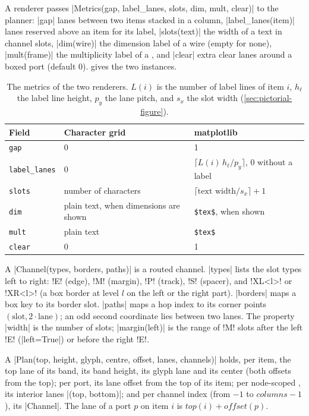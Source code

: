 \begin{definition}[Metrics]\label{def:pictorial-metrics}
A renderer passes \py|Metrics(gap, label_lanes, slots, dim, mult, clear)| to the planner:
\py|gap| lanes between two items stacked in a column, \py|label_lanes(item)| lanes reserved above
an item for its label, \py|slots(text)| the width of a text in channel slots,
\py|dim(wire)| the dimension label of a wire (empty for none), \py|mult(frame)| the
multiplicity label of a \bbox, and \py|clear| extra clear lanes around a boxed port (default 0).
 gives the two instances.
\end{definition}

\begin{table}[ht]
\centering
\caption{The metrics of the two renderers. $L(i)$ is the number of label lines of item $i$,
$h_\ell$ the label line height, $p_y$ the lane pitch, and $s_x$ the slot width
(\cref{sec:pictorial-figure}).}\label{tab:pictorial-metrics}
\begin{tabular}{@{}lll@{}}
\toprule
Field & Character grid & matplotlib \\
\midrule
\texttt{gap} & 0 & 1 \\
\texttt{label\_lanes} & 0 & $\lceil L(i)\,h_\ell / p_y\rceil$, 0 without a label \\
\texttt{slots} & number of characters & $\lceil \text{text width}/s_x\rceil + 1$ \\
\texttt{dim} & plain text, when dimensions are shown & \texttt{\$tex\$}, when shown \\
\texttt{mult} & plain text & \texttt{\$tex\$} \\
\texttt{clear} & 0 & 1 \\
\bottomrule
\end{tabular}
\end{table}

\begin{definition}\label{def:pictorial-plan}
A \py|Channel(types, borders, paths)| is a routed channel. \py|types| lists the slot types
left to right: \code!E! (edge), \code!M! (margin), \code!P! (track), \code!S! (spacer), and
\code!XL<l>! or \code!XR<l>! (a box border at level $l$ on the left or the right part).
\py|borders| maps a box key to its border slot. \py|paths| maps a hop index to its corner points
$(\text{slot}, 2\cdot\text{lane})$; an odd second coordinate lies between two lanes. The property
\py|width| is the number of slots; \py|margin(left)| is the range of \code!M! slots after the
left \code!E! (\py|left=True|) or before the right \code!E!.

A \py|Plan(top, height, glyph, centre, offset, lanes, channels)| holds, per item, the top lane of
its band, its band height, its glyph lane and its center (both offsets from the top); per port,
its lane offset from the top of its item; per node-scoped \bbox, its interior lanes
\py|(top, bottom)|; and per channel index (from $-1$ to $\mathit{columns}-1$), its
\py|Channel|. The lane of a port $p$ on item $i$ is
$\mathit{top}(i) + \mathit{offset}(p)$.
\end{definition}

